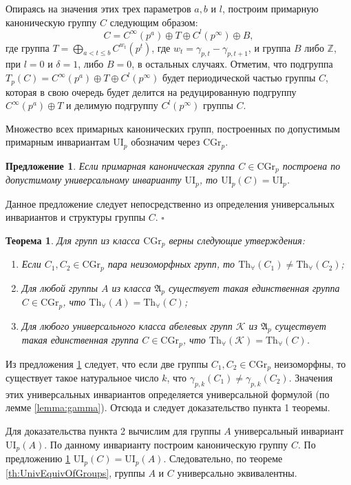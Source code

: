 \documentclass[a4paper,11pt,twoside]{article}
\newtheorem{theorem}{Теорема}[section]
\newtheorem{proposition}{Предложение}[section]
\def\proof{{\noindent{\bf Доказательство.}} }
\def\A{{\mathfrak{A}}}
\def\K{{\mathcal{K}}}
\def\Z{{\mathbb{Z}}}
\def\Tha{{\mathrm{Th}_\forall}}
\def\CG{{\mathrm{CGr}}}
\def\ui{{\mathrm{UI}}}
\begin{document}
Опираясь на значения этих трех параметров $a, b$ и $l$, построим примарную каноническую группу $C$ следующим образом:
$$C = C^\infty(p^a) \oplus T \oplus C^l(p^\infty) \oplus B ,$$
где группа $T = \bigoplus\limits_{ a < t \leq b} C^{w_t}(p^t)$, где $w_t = \gamma_{p,t} - \gamma_{p,t+1}$, и группа $B$ либо $\Z$, при $l = 0$ и $\delta = 1$, либо $B = 0$, в остальных случаях. Отметим, что подгруппа $T_p(C) = C^\infty(p^a) \oplus T \oplus C^l(p^\infty)$ будет периодической частью группы $C$, которая в свою очередь будет делится на редуцированную подгруппу $C^\infty(p^a) \oplus T$ и делимую подгруппу $C^l(p^\infty)$ группы $C$.

Множество всех примарных канонических групп, построенных по допустимым примарным инвариантам $\ui_p$ обозначим через $\CG_p$.

\begin{proposition}\label{prop:UnivEnvForCannonicalGroup}
Если примарная каноническая группа $C \in \CG_p$ построена по допустимому универсальному инварианту $\ui_p$, то $\ui_p(C) = \ui_p$.
\end{proposition}
\proof Данное предложение следует непосредственно из определения универсальных инвариантов и структуры группы $C$. $\square$

\begin{theorem}\label{th:CannonicalGroupsP}
Для групп из класса $\CG_p$ верны следующие утверждения:
\begin{enumerate}
\item Если $C_1, C_2 \in \CG_p$ пара неизоморфных групп, то $\Tha(C_1) \neq \Tha(C_2)$;
\item Для любой группы $A$ из класса $\A_p$ существует такая единственная группа $C \in \CG_p$, что $\Tha(A) = \Tha(C)$;
\item Для любого универсального класса абелевых групп $\K$ из $\A_p$ существует такая единственная группа $C \in \CG_p$, что $\Tha(\K) = \Tha(C)$.
\end{enumerate}
\end{theorem}
\proof Из предложения \ref{prop:UnivEnvForCannonicalGroup} следует, что если две группы $C_1, C_2 \in \CG_p$ неизоморфны, то существует такое натуральное число $k$, что $\gamma_{p,k}(C_1) \neq \gamma_{p,k}(C_2)$. Значения этих универсальных инвариантов определяется универсальной формулой (по лемме \ref{lemma:gamma}). Отсюда и следует доказательство пункта 1 теоремы.

Для доказательства пункта 2 вычислим для группы $A$ универсальный инвариант $\ui_p(A)$. По данному инварианту построим каноническую группу $C$. По предложению \ref{prop:UnivEnvForCannonicalGroup} $\ui_p(C) = \ui_p(A)$. Следовательно, по теореме \ref{th:UnivEquivOfGroups}, группы $A$ и $C$ универсально эквивалентны.
\end{document}

